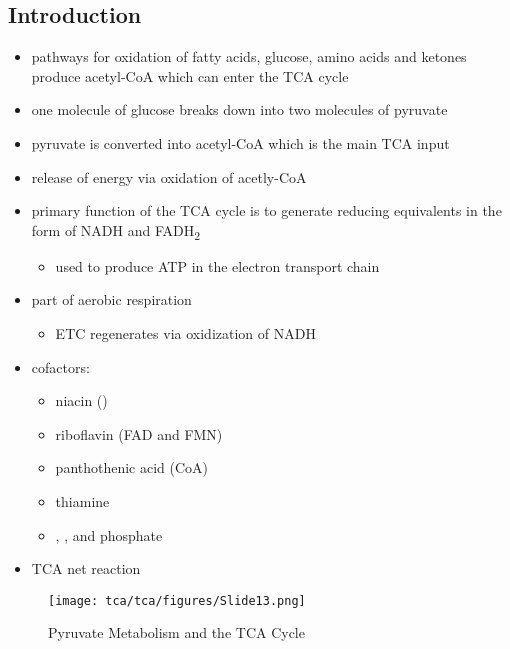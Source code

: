 \documentclass{scrartcl}
\begin{document}
\subsection{Introduction}
\label{sec:orge810667}
\begin{itemize}
\item pathways for oxidation of fatty acids, glucose, amino acids and
ketones produce acetyl-CoA which can enter the TCA cycle
\item one molecule of glucose breaks down into two molecules of pyruvate
\item pyruvate is converted into acetyl-CoA which is the main TCA input
\item release of energy via oxidation of acetly-CoA
\item primary function of the TCA cycle is to generate reducing
equivalents in the form of NADH and FADH\textsubscript{2}
\begin{itemize}
\item used to produce ATP in the electron transport chain
\end{itemize}
\end{itemize}

\centering
{}
\begin{itemize}
\item part of aerobic respiration
\begin{itemize}
\item ETC regenerates  via oxidization of NADH
\end{itemize}
\item cofactors:
\begin{itemize}
\item niacin ()
\item riboflavin (FAD and FMN)
\item panthothenic acid (CoA)
\item thiamine
\item {}, ,  and phosphate
\end{itemize}
\item TCA net reaction
\end{itemize}

{\tiny{}}

\begin{figure}[htbp]
\centering
\texttt{[image: tca/tca/figures/Slide13.png]}
\caption[TCA]{\label{fig:orga7815c8}Pyruvate Metabolism and the TCA Cycle}
\end{figure}
\end{document}
